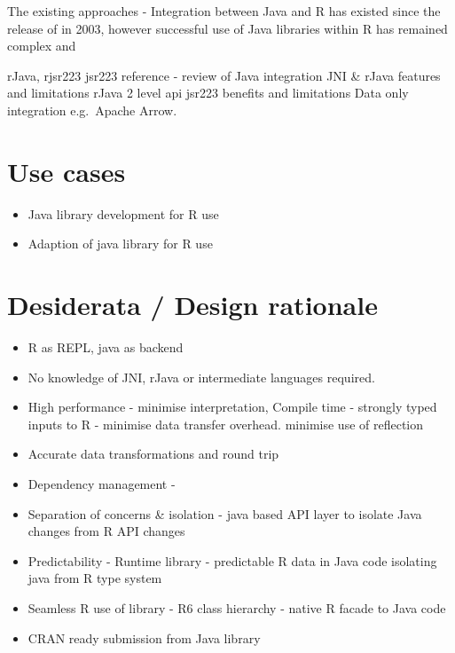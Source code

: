 The existing approaches - Integration between Java and R has existed
since the release of  in 2003, however successful use of
Java libraries within R has remained complex and

rJava, rjsr223 jsr223 reference - review of Java integration JNI \&
rJava features and limitations rJava 2 level api jsr223 benefits and
limitations Data only integration e.g.~Apache Arrow.

\hypertarget{use-cases}{%
\section{Use cases}\label{use-cases}}

\begin{itemize}
\tightlist
\item
  Java library development for R use
\item
  Adaption of java library for R use
\end{itemize}

\hypertarget{desiderata-design-rationale}{%
\section{Desiderata / Design
rationale}\label{desiderata-design-rationale}}

\begin{itemize}
\tightlist
\item
  R as REPL, java as backend
\item
  No knowledge of JNI, rJava or intermediate languages required.
\item
  High performance - minimise interpretation, Compile time - strongly
  typed inputs to R - minimise data transfer overhead. minimise use of
  reflection
\item
  Accurate data transformations and round trip
\item
  Dependency management -
\item
  Separation of concerns \& isolation - java based API layer to isolate
  Java changes from R API changes
\item
  Predictability - Runtime library - predictable R data in Java code
  isolating java from R type system
\item
  Seamless R use of library - R6 class hierarchy - native R facade to
  Java code
\item
  CRAN ready submission from Java library
\end{itemize}


